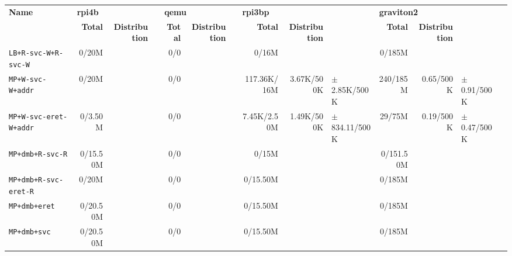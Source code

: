 \begin{tabular}{l  | r r l | r r l | r r l | r r l l}
   \textbf{Name}                  & \multicolumn{3}{l}{\textbf{rpi4b}}                       & \multicolumn{3}{l}{\textbf{qemu}}        & \multicolumn{3}{l}{\textbf{rpi3bp}}                         & \multicolumn{3}{l}{\textbf{graviton2}}                        & \\
                                  & \textbf{Total} & \textbf{Distribution} &                 & \textbf{Total} & \textbf{Distribution} &  & \textbf{Total} & \textbf{Distribution} &                   & \textbf{Total} & \textbf{Distribution} &                  & \\
        \verb|LB+R-svc-W+R-svc-W| &          0/20M &                       &                 &            0/0 &                       &  &          0/16M &                       &                   &         0/185M &                       &                  & \\ \hline 
           \verb|MP+W-svc-W+addr| &          0/20M &                       &                 &            0/0 &                       &  &    117.36K/16M &            3.67K/500K &  $\pm$ 2.85K/500K &       240/185M &             0.65/500K &  $\pm$ 0.91/500K & \\ \hline 
      \verb|MP+W-svc-eret-W+addr| &        0/3.50M &                       &                 &            0/0 &                       &  &    7.45K/2.50M &            1.49K/500K & $\pm$ 834.11/500K &         29/75M &             0.19/500K &  $\pm$ 0.47/500K & \\ \hline 
            \verb|MP+dmb+R-svc-R| &       0/15.50M &                       &                 &            0/0 &                       &  &          0/15M &                       &                   &      0/151.50M &                       &                  & \\ \hline 
       \verb|MP+dmb+R-svc-eret-R| &          0/20M &                       &                 &            0/0 &                       &  &       0/15.50M &                       &                   &         0/185M &                       &                  & \\ \hline 
               \verb|MP+dmb+eret| &       0/20.50M &                       &                 &            0/0 &                       &  &       0/15.50M &                       &                   &         0/185M &                       &                  & \\ \hline 
                \verb|MP+dmb+svc| &       0/20.50M &                       &                 &            0/0 &                       &  &       0/15.50M &                       &                   &         0/185M &                       &                  & \\ \hline 

\end{tabular}
